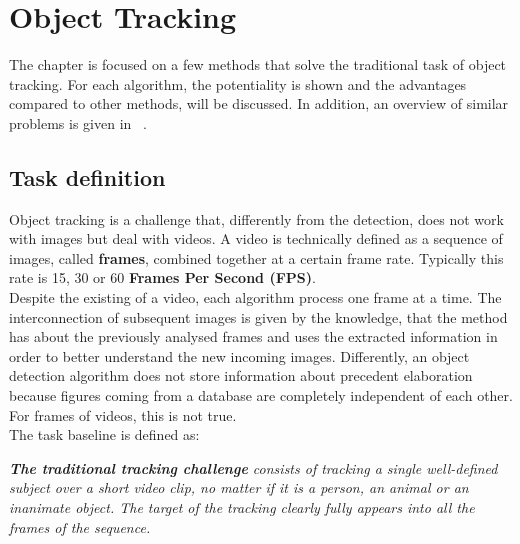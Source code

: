 \chapter{Object Tracking} \label{cha:tracking}
The chapter is focused on a few methods that solve the traditional task of object tracking. For each algorithm, the potentiality is shown and the advantages compared to other methods, will be discussed. In addition, an overview of similar problems is given in ~.



\section{Task definition} \label{sec:tracking-definition}
Object tracking is a challenge that, differently from the detection, does not work with images but deal with videos. A video is technically defined as a sequence of images, called \textbf{frames}, combined together at a certain frame rate. Typically this rate is 15, 30 or 60 \textbf{Frames Per Second (FPS)}.\\
Despite the existing of a video, each algorithm process one frame at a time. The interconnection of subsequent images is given by the knowledge, that the method has about the previously analysed frames and uses the extracted information in order to better understand the new incoming images. Differently, an object detection algorithm does not store information about precedent elaboration because figures coming from a database are completely independent of each other. For frames of videos, this is not true.\\
The task baseline is defined as:
\begin{tcolorbox}
	\begin{center}
		\textit{\textbf{The traditional tracking challenge} consists of tracking a single well-defined subject over a short video clip, no matter if it is a person, an animal or an inanimate object. The target of the tracking clearly fully appears into all the frames of the sequence.}
	\end{center}
\end{tcolorbox}


